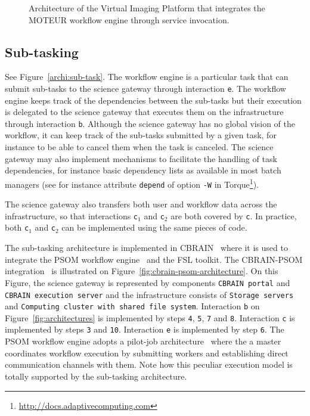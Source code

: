 \documentclass[preprint,3p,twocolumn]{elsarticle}
\begin{document}
\begin{figure*}
\def\svgwidth{2\columnwidth}

\caption{Architecture of the Virtual Imaging Platform that integrates
  the MOTEUR workflow engine through service invocation.}
\label{fig:vip-architecture}
\end{figure*}

\subsection{Sub-tasking}

See Figure~\ref{archi:sub-task}. The workflow engine is a particular
task that can submit sub-tasks to the science gateway through
interaction \texttt{e}. The workflow engine keeps track of the
dependencies between the sub-tasks but their execution is delegated to
the science gateway that executes them on the infrastructure through
interaction \texttt{b}. Although the science gateway has no global
vision of the workflow, it can keep track of the sub-tasks submitted
by a given task, for instance to be able to cancel them when the task
is canceled. The science gateway may also implement mechanisms to
facilitate the handling of task dependencies, for instance basic
dependency lists as available in most batch managers (see for instance
attribute \texttt{depend} of option \texttt{-W} in
Torque\footnote{\url{http://docs.adaptivecomputing.com}}).

The science gateway also transfers both user and workflow data across
the infrastructure, so that interactions \texttt{c$_1$} and
\texttt{c$_2$} are both covered by \texttt{c}. In practice, both
\texttt{c$_1$} and \texttt{c$_2$} can be implemented using the same
pieces of code.

The sub-tasking architecture is implemented in CBRAIN~\cite{SHER-14}
where it is used to integrate the PSOM workflow
engine~\cite{bellec2012pipeline} and the FSL toolkit. The CBRAIN-PSOM
integration~\cite{GLAT-16} is illustrated on
Figure~\ref{fig:cbrain-psom-architecture}. On this Figure, the science
gateway is represented by components \texttt{CBRAIN portal} and
\texttt{CBRAIN execution server} and the infrastructure consists of
\texttt{Storage servers} and \texttt{Computing cluster with shared
  file system}. Interaction \texttt{b} on
Figure~\ref{fig:architectures} is implemented by steps \texttt{4},
\texttt{5}, \texttt{7} and \texttt{8}. Interaction \texttt{c} is
implemented by steps \texttt{3} and \texttt{10}. Interaction
\texttt{e} is implemented by step \texttt{6}. The PSOM workflow engine
adopts a pilot-job architecture~\cite{turilli2015comprehensive} where
the a master coordinates workflow execution by submitting workers
and establishing direct communication channels with them. Note how
this peculiar execution model is totally supported by the sub-tasking
architecture.
\end{document}

